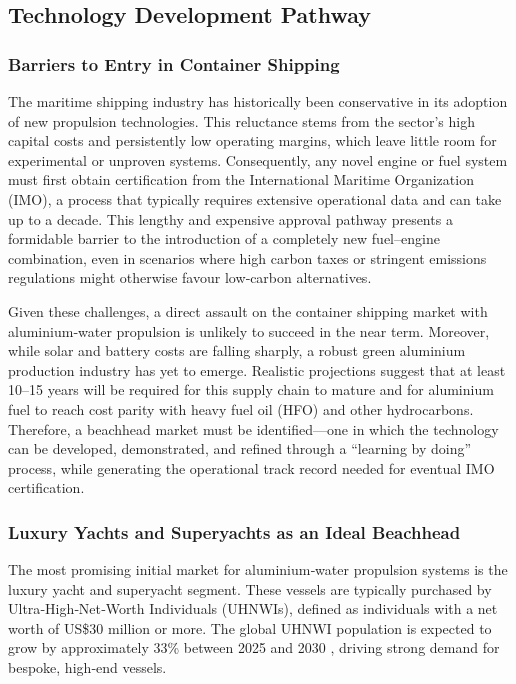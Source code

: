 \documentclass[12pt]{article}
\begin{document}
\break

\subsection{Technology Development Pathway}

\subsubsection{Barriers to Entry in Container Shipping}

The maritime shipping industry has historically been conservative in its adoption of new propulsion technologies. This reluctance stems from the sector’s high capital costs and persistently low operating margins, which leave little room for experimental or unproven systems. Consequently, any novel engine or fuel system must first obtain certification from the International Maritime Organization (IMO), a process that typically requires extensive operational data and can take up to a decade. This lengthy and expensive approval pathway presents a formidable barrier to the introduction of a completely new fuel–engine combination, even in scenarios where high carbon taxes or stringent emissions regulations might otherwise favour low‑carbon alternatives.

Given these challenges, a direct assault on the container shipping market with aluminium‑water propulsion is unlikely to succeed in the near term. Moreover, while solar and battery costs are falling sharply, a robust green aluminium production industry has yet to emerge. Realistic projections suggest that at least 10–15 years will be required for this supply chain to mature and for aluminium fuel to reach cost parity with heavy fuel oil (HFO) and other hydrocarbons. Therefore, a beachhead market must be identified—one in which the technology can be developed, demonstrated, and refined through a “learning by doing” process, while generating the operational track record needed for eventual IMO certification. \cite{tesla-beachhead}

\subsubsection{Luxury Yachts and Superyachts as an Ideal Beachhead}

The most promising initial market for aluminium‑water propulsion systems is the luxury yacht and superyacht segment. These vessels are typically purchased by Ultra‑High‑Net‑Worth Individuals (UHNWIs), defined as individuals with a net worth of US\$30 million or more. The global UHNWI population is expected to grow by approximately 33\% between 2025 and 2030 \cite{high-net-worth-individuals-growth}, driving strong demand for bespoke, high‑end vessels.
\end{document}
